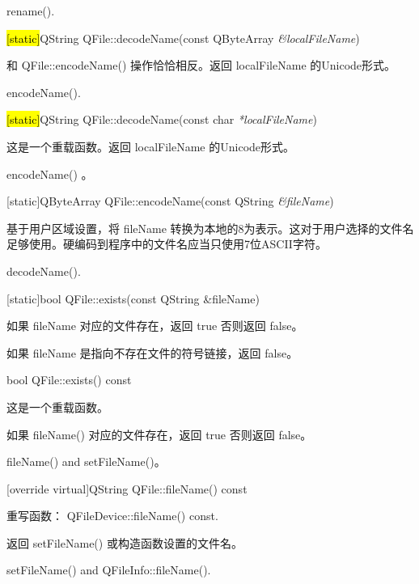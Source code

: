 \begin{seeAlso}
rename().
\end{seeAlso} 

\hl{[static]}QString QFile::decodeName(const QByteArray \emph{\&localFileName})

和 QFile::encodeName() 操作恰恰相反。返回 localFileName 的Unicode形式。


\begin{seeAlso}
encodeName().
\end{seeAlso} 

\hl{[static]}QString QFile::decodeName(const char \emph{*localFileName})

这是一个重载函数。返回 localFileName 的Unicode形式。


\begin{seeAlso}
 encodeName() 。
\end{seeAlso} 


[static]QByteArray QFile::encodeName(const QString \emph{\&fileName})

基于用户区域设置，将 fileName 转换为本地的8为表示。这对于用户选择的文件名足够使用。硬编码到程序中的文件名应当只使用7位ASCII字符。


\begin{seeAlso}
decodeName().
\end{seeAlso} 

[static]bool QFile::exists(const QString \&fileName)

如果 fileName 对应的文件存在，返回 true 否则返回 false。



\begin{notice}
如果 fileName 是指向不存在文件的符号链接，返回 false。
\end{notice} 

bool QFile::exists() const

这是一个重载函数。

如果 fileName() 对应的文件存在，返回 true 否则返回 false。



\begin{seeAlso}
fileName() and setFileName()。
\end{seeAlso} 

[override virtual]QString QFile::fileName() const

重写函数： QFileDevice::fileName() const.

返回 setFileName() 或构造函数设置的文件名。


\begin{seeAlso}
setFileName() and QFileInfo::fileName().
\end{seeAlso} 

